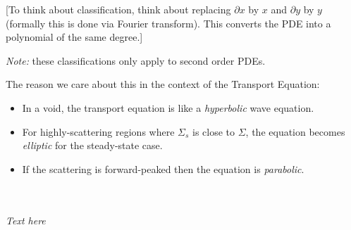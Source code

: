 \documentclass[12pt]{exam}
\newcommand{\Macro}{\ensuremath{\Sigma}}
\begin{document}
[To think about classification, think about replacing $\partial x$ by $x$ and  $\partial y$ by $y$ (formally this is done via Fourier transform). This converts the PDE into a polynomial of the same degree.]

\textit{Note:} these classifications only apply to second order PDEs. 

\noindent The reason we care about this in the context of the Transport Equation:
\ifprintanswers
\begin{itemize}
\item In a void, the transport equation is like a \textit{hyperbolic} wave equation. 
\item For highly-scattering regions where $\Macro_{s}$ is close to $\Macro$, the equation becomes \textit{elliptic} for the steady-state case. 
\item If the scattering is forward-peaked then the equation is \textit{parabolic}.
\end{itemize}
\else
 \\ \\  \hspace*{8em} \textit{Text here} 
\fi
\end{document}
